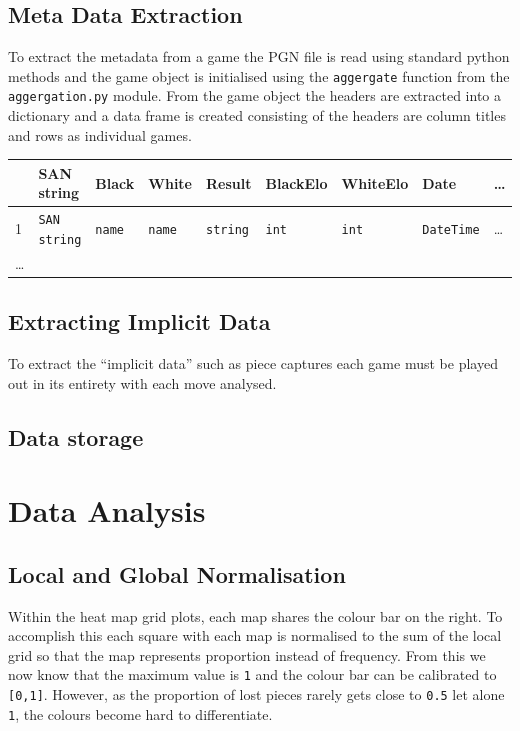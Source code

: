 \documentclass[11pt]{article}
\begin{document}
\subsection{Meta Data Extraction}
\label{sec:orgea88f54}
To extract the metadata from a game the PGN file is read using standard python methods and the game object is initialised using the \texttt{aggergate} function from the \texttt{aggergation.py} module. From the game object the headers are extracted into a dictionary and a data frame is created consisting of the headers are column titles and rows as individual games.

\begin{center}
\begin{tabular}{lllllllll}
 & SAN string & Black & White & Result & BlackElo & WhiteElo & Date & \ldots{}\\
\hline
1 & \texttt{SAN string} & \texttt{name} & \texttt{name} & \texttt{string} & \texttt{int} & \texttt{int} & \texttt{DateTime} & \ldots{}\\
\ldots{} &  &  &  &  &  &  &  & \\
\end{tabular}
\end{center}


\subsection{Extracting Implicit Data}
\label{sec:org8b58e87}
To extract the ``implicit data'' such as piece captures each game must be played out in its entirety with each move analysed.
\subsection{Data storage}
\label{sec:orgc31b0eb}
\section{Data Analysis}
\label{sec:org2a4fc91}
\subsection{Local and Global Normalisation}
\label{sec:orgc010276}
Within the heat map grid plots, each map shares the colour bar on the right. To accomplish this each square with each map is normalised to the sum of the local grid so that the map represents proportion instead of frequency. From this we now know that the maximum value is \texttt{1} and the colour bar can be calibrated to \texttt{[0,1]}. However, as the proportion of lost pieces rarely gets close to \texttt{0.5} let alone \texttt{1}, the colours become hard to differentiate.
\end{document}
